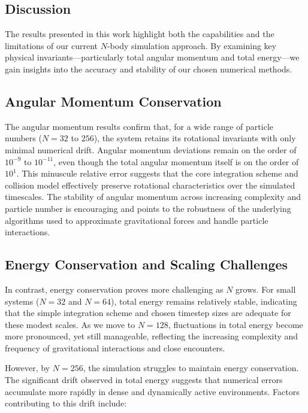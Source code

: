 \documentclass[a4paper, 12pt, oneside, onecolumn]{article}
\begin{document}
\begin{multicols}{2}
\section{Discussion}

The results presented in this work highlight both the capabilities and the limitations of our current $N$-body simulation approach. By examining key physical invariants—particularly total angular momentum and total energy—we gain insights into the accuracy and stability of our chosen numerical methods.

\subsection*{Angular Momentum Conservation}

The angular momentum results confirm that, for a wide range of particle numbers ($N = 32$ to $256$), the system retains its rotational invariants with only minimal numerical drift. Angular momentum deviations remain on the order of $10^{-9}$ to $10^{-11}$, even though the total angular momentum itself is on the order of $10^1$. This minuscule relative error suggests that the core integration scheme and collision model effectively preserve rotational characteristics over the simulated timescales. The stability of angular momentum across increasing complexity and particle number is encouraging and points to the robustness of the underlying algorithms used to approximate gravitational forces and handle particle interactions.

\subsection*{Energy Conservation and Scaling Challenges}

In contrast, energy conservation proves more challenging as $N$ grows. For small systems ($N = 32$ and $N = 64$), total energy remains relatively stable, indicating that the simple integration scheme and chosen timestep sizes are adequate for these modest scales. As we move to $N = 128$, fluctuations in total energy become more pronounced, yet still manageable, reflecting the increasing complexity and frequency of gravitational interactions and close encounters.

However, by $N = 256$, the simulation struggles to maintain energy conservation. The significant drift observed in total energy suggests that numerical errors accumulate more rapidly in dense and dynamically active environments. Factors contributing to this drift include:


\end{multicols}
\end{document}

